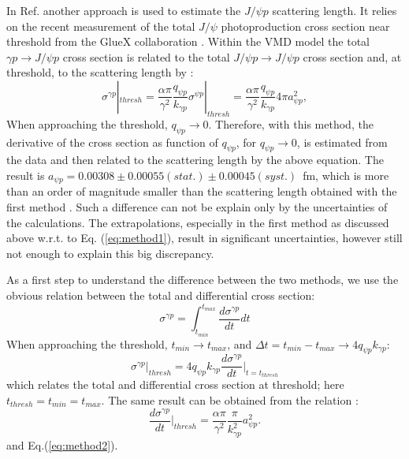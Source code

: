 \documentclass[%
preprint,
nofootinbib,
 amsmath,amssymb,
 aps,
floatfix,
]{revtex4-1}
\begin{document}
In Ref. \cite{Strakovsky_jpsi} another approach is used to estimate the 
$J/\psi p$ scattering length. It relies on the recent measurement
of the total $J/\psi $ photoproduction cross section near threshold 
from the GlueX collaboration \cite{prl_gluex}.
Within the VMD model the total $\gamma p \to J/\psi p$ cross section is
related to the total $J/\psi p \to J/\psi p$ cross section 
and, at threshold, to the scattering length by \cite{Titov}: 
\begin{equation}
\sigma^{\gamma p}| _{thresh} = 
\frac{\alpha \pi}{\gamma ^2}\frac{q_{\psi p}}{k_{\gamma p}}
\sigma^{\psi p}| _{thresh} =
\frac{\alpha \pi}{\gamma ^2}\frac{q_{\psi p}}{k_{\gamma p}}
4\pi a_{\psi p}^2,
\label{eq:method2}
\end{equation}
When approaching the threshold, $q_{\psi p} \rightarrow 0$.
Therefore, with this method, the derivative of the cross section as function
of $q_{\psi p}$, for $q_{\psi p} \rightarrow 0$, is estimated from the data 
and then related to the scattering length by the above equation.
The result is $a_{\psi p} = 0.00308 \pm 0.00055(stat.) \pm 0.00045(syst.)$~fm,
which is more than an order of magnitude smaller than 
the scattering length obtained with the first method \cite{Vanderhaeghen_jpsi}.
Such a difference can not be explain only by the uncertainties
of the calculations. 
The extrapolations, especially in the first method as discussed above w.r.t. to Eq. (\ref{eq:method1}), 
result in significant uncertainties, however still not enough to explain this big discrepancy.

As a first step to understand the difference between the two methods,
we use the obvious relation between the 
total and differential cross section:
\begin{equation}
\sigma^{\gamma p}=\int _{t_{min}}^{t_{max}} \frac{d\sigma^{\gamma p}}{dt} dt 
\end{equation}
When approaching the threshold, $t_{min} \rightarrow t_{max}$, and 
$\Delta t = t_{min} - t_{max} \rightarrow 4q_{\psi p}k_{\gamma p}$:
\begin{equation}
\sigma^{\gamma p}|_{thresh}=4q_{\psi p}k_{\gamma p}\frac{d\sigma^{\gamma p}}{dt} \Big|_{t=t_{thresh}} 
\label{eq:totdiff}
\end{equation}
which relates the total and differential cross section at threshold; 
here $t_{thresh}=t_{min}=t_{max}$.
The same result can be obtained from the relation \cite{Titov}:
\begin{equation}
\frac{d\sigma^{\gamma p}}{dt}\Big| _{thresh} = 
\frac{\alpha \pi}{\gamma ^2}\frac{\pi }{k_{\gamma p}^2}a_{\psi p}^2.
\end{equation}
and Eq.(\ref{eq:method2}).
\end{document}
